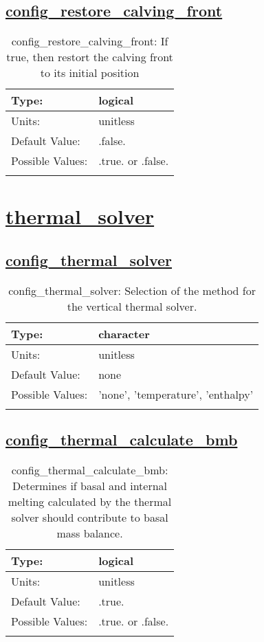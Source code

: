 \subsection[config\_restore\_calving\_front]{\hyperref[sec:nm_tab_calving]{config\_restore\_calving\_front}}
\label{subsec:nm_sec_config_restore_calving_front}
\begin{center}
\begin{longtable}{| p{2.0in} || p{4.0in} |}
    \hline
    Type: & logical \\
    \hline
    Units: & \si{unitless} \\
    \hline
    Default Value: & .false. \\
    \hline
    Possible Values: & .true. or .false. \\
    \hline
    \caption{config\_restore\_calving\_front: If true, then restort the calving front to its initial position}
\end{longtable}
\end{center}
\section[thermal\_solver]{\hyperref[sec:nm_tab_thermal_solver]{thermal\_solver}}
\label{sec:nm_sec_thermal_solver}
\subsection[config\_thermal\_solver]{\hyperref[sec:nm_tab_thermal_solver]{config\_thermal\_solver}}
\label{subsec:nm_sec_config_thermal_solver}
\begin{center}
\begin{longtable}{| p{2.0in} || p{4.0in} |}
    \hline
    Type: & character \\
    \hline
    Units: & \si{unitless} \\
    \hline
    Default Value: & none \\
    \hline
    Possible Values: & 'none', 'temperature', 'enthalpy' \\
    \hline
    \caption{config\_thermal\_solver: Selection of the method for the vertical thermal solver.}
\end{longtable}
\end{center}
\subsection[config\_thermal\_calculate\_bmb]{\hyperref[sec:nm_tab_thermal_solver]{config\_thermal\_calculate\_bmb}}
\label{subsec:nm_sec_config_thermal_calculate_bmb}
\begin{center}
\begin{longtable}{| p{2.0in} || p{4.0in} |}
    \hline
    Type: & logical \\
    \hline
    Units: & \si{unitless} \\
    \hline
    Default Value: & .true. \\
    \hline
    Possible Values: & .true. or .false. \\
    \hline
    \caption{config\_thermal\_calculate\_bmb: Determines if basal and internal melting calculated by the thermal solver should contribute to basal mass balance.}
\end{longtable}
\end{center}
